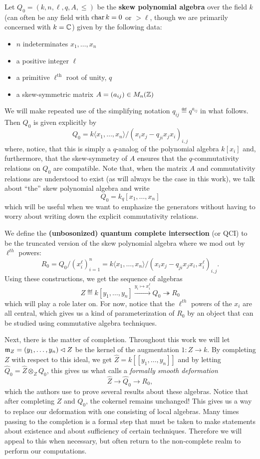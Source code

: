 \documentclass [11pt, proquest] {uwthesis}[2020/02/24]
\begin{document}
    Let $Q_0=(k, n, \ell, q, A, \le)$ be the \textbf{skew polynomial algebra} over the field $k$ (can often be any field with $\operatorname{char} k=0$ or $>\ell$, though we are primarily concerned with $k=\mathbb{C}$) given by the following data:
    \begin{itemize}
        \item $n$ indeterminates $x_1,\dots, x_n$
        \item a positive integer $\ell$
        \item a primitive $\ell^\text{th}$ root of unity, $q$
        \item a skew-symmetric matrix $A=(a_{ij})\in M_n(\mathbb{Z})$
    \end{itemize}
    We will make repeated use of the simplifying notation $q_{ij}\eqdef q^{a_{ij}}$ in what follows. Then $Q_0$ is given explicitly by
    \[Q_0=k\langle x_1,\dots,x_n\rangle/(x_ix_j-q_{ji}x_jx_i)_{i,j}\]
    where, notice, that this is simply a $q$-analog of the polynomial algebra $k[x_i]$ and, furthermore, that the skew-symmetry of $A$ ensures that the $q$-commutativity relations on $Q_0$ are compatible. Note that, when the matrix $A$ and commutativity relations are understood to exist (as will always be the case in this work), we talk about ``the'' skew polynomial algebra and write
    \[Q_0 = k_q[x_1,\dots,x_n]\]
    which will be useful when we want to emphasize the generators without having to worry about writing down the explicit commutativity relations.
    
    We define the \textbf{(unbosonized) quantum complete intersection} (or QCI) to be the truncated version of the skew polynomial algebra where we mod out by $\ell^{th}$ powers:
    \[R_0 = Q_0/(x_i^\ell)_{i=1}^n=k\langle x_1,\dots,x_n\rangle/(x_ix_j-q_{ji}x_jx_i, x_i^\ell)_{i,j}.\]
    Using these constructions, we get the sequence of algebras
    \[Z\eqdef k[y_1,\dots,y_n]\xrightarrow{y_i\mapsto x_i^\ell} Q_0\twoheadrightarrow R_0\]
    which will play a role later on. For now, notice that the $\ell^{th}$ powers of the $x_i$ are all central, which gives us a kind of parameterization of $R_0$ by an object that can be studied using commutative algebra techniques.
    
    Next, there is the matter of completion. Throughout this work we will let $\mathfrak{m}_Z=(y_1,\dots,y_n)\lhd Z$ be the kernel of the augmentation $1:Z\to k$. By completing $Z$ with respect to this ideal, we get $\widehat Z=k[[y_1,\dots,y_n]]$ and by letting $\widehat Q_0=\widehat Z\otimes_Z Q_0$, this gives us what \cite{negron-pevtsovaII} calls a \textit{formally smooth deformation}
    \[\widehat Z\to \widehat Q_0\to R_0,\label{eq:formally-smooth-deformation} \tag{FSD}\]
    which the authors use to prove several results about these algebras. Notice that after completing $Z$ and $Q_0$, the cokernel remains unchanged! This gives us a way to replace our deformation with one consisting of local algebras. Many times passing to the completion is a formal step that must be taken to make statements about existence and about sufficiency of certain techniques. Therefore we will appeal to this when necessary, but often return to the non-complete realm to perform our computations.
    
\end{document}
